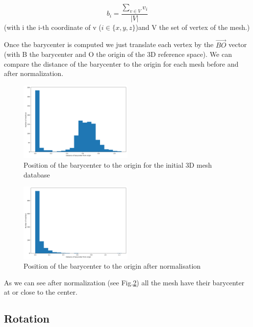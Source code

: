 \documentclass[10pt,twocolumn,letterpaper]{article}
\begin{document}
$$ b_i = \frac{\sum_{v \in V} v_i}{|V|}  $$ (with i the i-th coordinate of v ($i \in \{x,y,z\}$)and V the set of vertex of the mesh.)
	
	Once the barycenter is computed we just translate each vertex by the $\overrightarrow{BO}$ vector (with B the barycenter and O the origin of the 3D reference space). We can compare the distance of the barycenter to the origin for each mesh before and after normalization.
	
\begin{figure}[h!]
\begin{center}
  \includegraphics[width=0.5\textwidth]{picture/Initial barycenter}
  \caption{Position of the barycenter to the origin for the initial 3D mesh database}
  \label{fig:barycenter-before}
  \end{center}
\end{figure}

\begin{figure}[h!]
\begin{center}
  \includegraphics[width=0.5\textwidth]{picture/Normalised barycenter}
  \caption{Position of the barycenter to the origin after normalisation}
  \label{fig:barycenter-after}
  \end{center}
\end{figure}

As we can see after normalization (see Fig.\ref{fig:barycenter-after}) all the mesh have their barycenter at or close to the center.

\subsection{Rotation}
\end{document}
